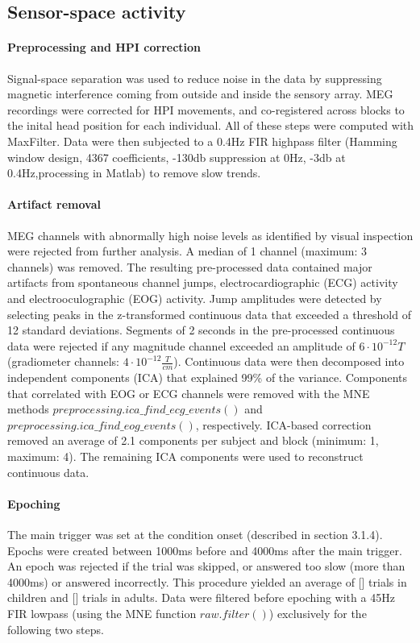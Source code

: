 \subsection{Sensor-space activity}

\paragraph{Preprocessing and HPI correction}
Signal-space separation \cite{3.3.SSS} was used to reduce noise in the data by suppressing magnetic interference coming from outside and inside the sensory array.
MEG recordings were corrected for HPI movements, and co-registered across blocks to the inital head position for each individual.
All of these steps were computed with MaxFilter.
Data were then subjected to a 0.4Hz FIR highpass filter (Hamming window design, 4367 coefficients, -130db suppression at 0Hz, -3db at 0.4Hz,processing in Matlab) to remove slow trends.

\paragraph{Artifact removal}
MEG channels with abnormally high noise levels as identified by visual inspection were rejected from further analysis. A median of 1 channel (maximum: 3 channels) was removed.
The resulting pre-processed data contained major artifacts from spontaneous channel jumps, electrocardiographic (ECG) activity and electrooculographic (EOG) activity.
Jump amplitudes were detected by selecting peaks in the z-transformed continuous data that exceeded a threshold of 12 standard deviations.
Segments of 2 seconds in the pre-processed continuous data were rejected if any magnitude channel exceeded an amplitude of $6\cdot10^{-12}T$ (gradiometer channels: $4\cdot10^{-12}\frac{T}{cm}$).
Continuous data were then decomposed into independent components (ICA) that explained 99\% of the variance.
Components that correlated with EOG or ECG channels were removed with the MNE methods $preprocessing.ica\_find\_ecg\_events()$ and $preprocessing.ica\_find\_eog\_events()$, respectively.
ICA-based correction removed an average of 2.1 components per subject and block (minimum: 1, maximum: 4).
The remaining ICA components were used to reconstruct continuous data.

\paragraph{Epoching}
The main trigger was set at the condition onset (described in section 3.1.4).
Epochs were created between 1000ms before and 4000ms after the main trigger.
An epoch was rejected if the trial was skipped, or answered too slow (more than 4000ms) or answered incorrectly.
This procedure yielded an average of [] trials in children and [] trials in adults.
Data were filtered before epoching with a 45Hz FIR lowpass (using the MNE function $raw.filter()$) exclusively for the following two steps.

